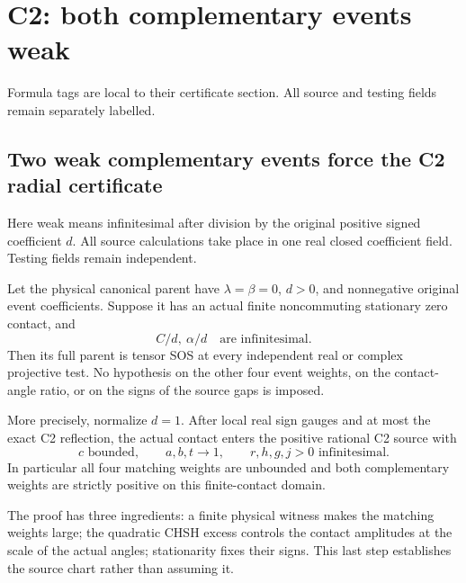 \chapter{C2: both complementary events weak}
\label{ch:cert-5}
Formula tags are local to their certificate section. All source and testing fields remain separately labelled.

\section{\texorpdfstring{Two weak complementary events force the C2 radial certificate}{Two weak complementary events force the C2 radial certificate}}
\label{component:p534f57e1da6f}

\label{p534f57e1da6f:sec:chart-free-c2}

Here weak means infinitesimal after division by the original positive
signed coefficient \(d\). All source calculations take place in one real
closed coefficient field. Testing fields remain independent.

\begin{theorem}
\label{p534f57e1da6f:thm:chart-free-c2}
Let the physical canonical parent have \(\lambda=\beta=0\), \(d>0\),
and nonnegative original event coefficients. Suppose it has an actual
finite noncommuting stationary zero contact, and
\[
                    C/d,\ \alpha/d\quad\text{are infinitesimal}.
\]
Then its full parent is tensor SOS at every independent real or complex
projective test. No hypothesis on the other four event weights, on the
contact-angle ratio, or on the signs of the source gaps is imposed.

More precisely, normalize \(d=1\). After local real sign gauges and at
most the exact C2 reflection,
the actual contact enters the positive rational C2 source with
\[
 c\text{ bounded},\qquad a,b,t\longrightarrow1,\qquad
 r,h,g,j>0\text{ infinitesimal}.
\]
In particular all four matching weights are unbounded and both
complementary weights are strictly positive on this finite-contact domain.
\end{theorem}

The proof has three ingredients: a finite physical witness makes the
matching weights large; the quadratic CHSH excess controls the contact
amplitudes at the scale of the actual angles; stationarity fixes their
signs. This last step establishes the source chart rather than assuming it.

